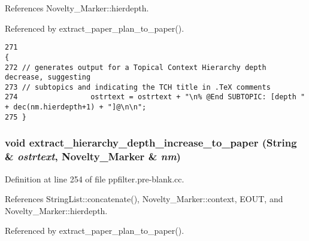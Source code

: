 References Novelty\_\-Marker::hierdepth.

Referenced by extract\_\-paper\_\-plan\_\-to\_\-paper().



\footnotesize\begin{verbatim}271                                                                                        {
272 // generates output for a Topical Context Hierarchy depth decrease, suggesting
273 // subtopics and indicating the TCH title in .TeX comments
274                 ostrtext = ostrtext + "\n% @End SUBTOPIC: [depth " + dec(nm.hierdepth+1) + "]@\n\n";
275 }
\end{verbatim}\normalsize 
{}
\subsubsection{\setlength{\rightskip}{0pt plus 5cm}void extract\_\-hierarchy\_\-depth\_\-increase\_\-to\_\-paper ({\bf String} \& {\em ostrtext}, {\bf Novelty\_\-Marker} \& {\em nm})}\label{ppfilter_8pre-blank_8cc_a5}




Definition at line 254 of file ppfilter.pre-blank.cc.

References String\-List::concatenate(), Novelty\_\-Marker::context, EOUT, and Novelty\_\-Marker::hierdepth.

Referenced by extract\_\-paper\_\-plan\_\-to\_\-paper().



